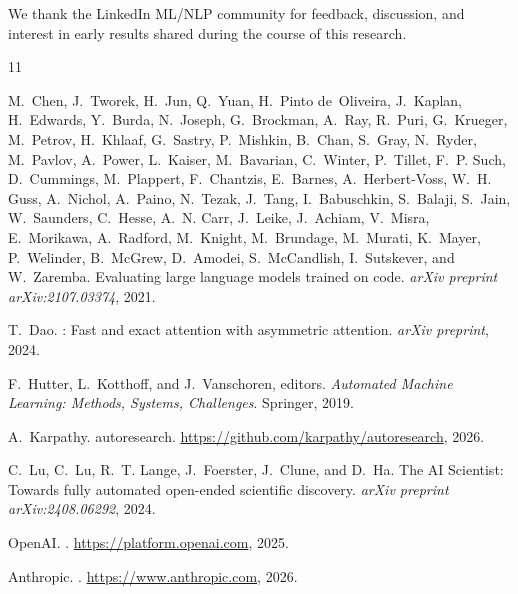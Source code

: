 \documentclass[11pt]{article}
\begin{document}
We thank the LinkedIn ML/NLP community for feedback, discussion, and interest in early results shared during the course of this research.



\begin{thebibliography}{11}

M.~Chen, J.~Tworek, H.~Jun, Q.~Yuan, H.~Pinto de~Oliveira, J.~Kaplan, H.~Edwards, Y.~Burda, N.~Joseph, G.~Brockman, A.~Ray, R.~Puri, G.~Krueger, M.~Petrov, H.~Khlaaf, G.~Sastry, P.~Mishkin, B.~Chan, S.~Gray, N.~Ryder, M.~Pavlov, A.~Power, L.~Kaiser, M.~Bavarian, C.~Winter, P.~Tillet, F.~P. Such, D.~Cummings, M.~Plappert, F.~Chantzis, E.~Barnes, A.~Herbert-Voss, W.~H. Guss, A.~Nichol, A.~Paino, N.~Tezak, J.~Tang, I.~Babuschkin, S.~Balaji, S.~Jain, W.~Saunders, C.~Hesse, A.~N. Carr, J.~Leike, J.~Achiam, V.~Misra, E.~Morikawa, A.~Radford, M.~Knight, M.~Brundage, M.~Murati, K.~Mayer, P.~Welinder, B.~McGrew, D.~Amodei, S.~McCandlish, I.~Sutskever, and W.~Zaremba.
\newblock Evaluating large language models trained on code.
\newblock \emph{arXiv preprint arXiv:2107.03374}, 2021.

T.~Dao.
: Fast and exact attention with asymmetric attention.
\newblock \emph{arXiv preprint}, 2024.

F.~Hutter, L.~Kotthoff, and J.~Vanschoren, editors.
\newblock \emph{Automated Machine Learning: Methods, Systems, Challenges}.
\newblock Springer, 2019.


A.~Karpathy.
\newblock autoresearch.
\newblock \url{https://github.com/karpathy/autoresearch}, 2026.

C.~Lu, C.~Lu, R.~T. Lange, J.~Foerster, J.~Clune, and D.~Ha.
\newblock The {AI} {Scientist}: Towards fully automated open-ended scientific discovery.
\newblock \emph{arXiv preprint arXiv:2408.06292}, 2024.

{OpenAI}.
.
\newblock \url{https://platform.openai.com}, 2025.

{Anthropic}.
.
\newblock \url{https://www.anthropic.com}, 2026.


\end{thebibliography}
\end{document}
